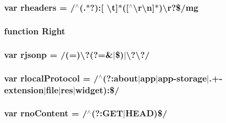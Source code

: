 \hypertarget{jquery-1_89_81_8js_af506d11612139f03091db71089d92e8b}{
\subsubsection[{rheaders}]{\setlength{\rightskip}{0pt plus 5cm}var rheaders = /$^\wedge$(.$\ast$?)\+:\mbox{[} \textbackslash{}{\bf t}\mbox{]}$\ast$(\mbox{[}$^\wedge$\textbackslash{}{\bf r\textbackslash{}n}\mbox{]}$\ast$)\textbackslash{}{\bf r}?\$/mg}}\label{jquery-1_89_81_8js_af506d11612139f03091db71089d92e8b}
\hypertarget{jquery-1_89_81_8js_ac7f66efc33d974809d85fc5bdb00c6eb}{
\subsubsection[{Right}]{\setlength{\rightskip}{0pt plus 5cm}function Right}}\label{jquery-1_89_81_8js_ac7f66efc33d974809d85fc5bdb00c6eb}
\hypertarget{jquery-1_89_81_8js_a8b62e46075611fd1fc0bbb78b14d113a}{
\subsubsection[{rjsonp}]{\setlength{\rightskip}{0pt plus 5cm}var rjsonp = /(=)\textbackslash{}?(?=\&$\vert$\$)$\vert$\textbackslash{}?\textbackslash{}?/}}\label{jquery-1_89_81_8js_a8b62e46075611fd1fc0bbb78b14d113a}
\hypertarget{jquery-1_89_81_8js_af4dd13c90298bbf53ce08ec707dc9e2a}{
\subsubsection[{rlocal\+Protocol}]{\setlength{\rightskip}{0pt plus 5cm}var rlocal\+Protocol = /$^\wedge$(?\+:about$\vert$app$\vert$app-\/storage$\vert$.+-\/extension$\vert$file$\vert$res$\vert${\bf widget})\+:\$/}}\label{jquery-1_89_81_8js_af4dd13c90298bbf53ce08ec707dc9e2a}
\hypertarget{jquery-1_89_81_8js_a537d744d72e31ec312aa3f16ef576d3f}{
\subsubsection[{rno\+Content}]{\setlength{\rightskip}{0pt plus 5cm}var rno\+Content = /$^\wedge$(?\+:G\+E\+T$\vert$H\+E\+A\+D)\$/}}\label{jquery-1_89_81_8js_a537d744d72e31ec312aa3f16ef576d3f}
